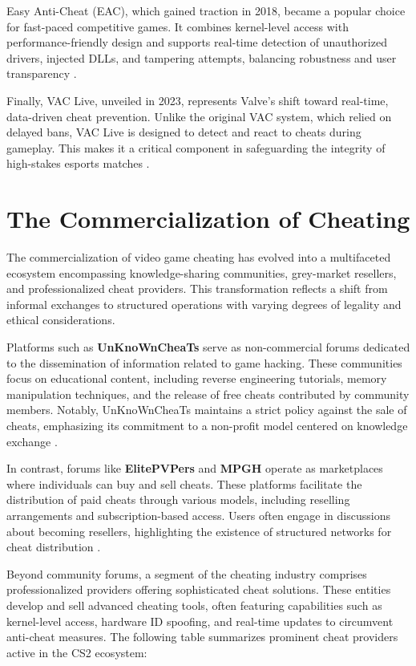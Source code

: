 Easy Anti-Cheat (EAC), which gained traction in 2018, became a popular choice for fast-paced competitive games. It combines kernel-level access with performance-friendly design and supports real-time detection of unauthorized drivers, injected DLLs, and tampering attempts, balancing robustness and user transparency \parencite{eac_website}.

Finally, VAC Live, unveiled in 2023, represents Valve's shift toward real-time, data-driven cheat prevention. Unlike the original VAC system, which relied on delayed bans, VAC Live is designed to detect and react to cheats during gameplay. This makes it a critical component in safeguarding the integrity of high-stakes esports matches \parencite{vac_live_announcement}.


\section{The Commercialization of Cheating}

The commercialization of video game cheating has evolved into a multifaceted ecosystem encompassing knowledge-sharing communities, grey-market resellers, and professionalized cheat providers. This transformation reflects a shift from informal exchanges to structured operations with varying degrees of legality and ethical considerations.

Platforms such as \textbf{UnKnoWnCheaTs} serve as non-commercial forums dedicated to the dissemination of information related to game hacking. These communities focus on educational content, including reverse engineering tutorials, memory manipulation techniques, and the release of free cheats contributed by community members. Notably, UnKnoWnCheaTs maintains a strict policy against the sale of cheats, emphasizing its commitment to a non-profit model centered on knowledge exchange \parencite{unknowncheats_forum}.

In contrast, forums like \textbf{ElitePVPers} and \textbf{MPGH} operate as marketplaces where individuals can buy and sell cheats. These platforms facilitate the distribution of paid cheats through various models, including reselling arrangements and subscription-based access. Users often engage in discussions about becoming resellers, highlighting the existence of structured networks for cheat distribution \parencite{elitepvpers_reseller}.

Beyond community forums, a segment of the cheating industry comprises professionalized providers offering sophisticated cheat solutions. These entities develop and sell advanced cheating tools, often featuring capabilities such as kernel-level access, hardware ID spoofing, and real-time updates to circumvent anti-cheat measures. The following table summarizes prominent cheat providers active in the CS2 ecosystem:

